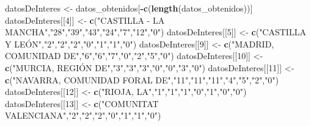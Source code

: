 \documentclass[
]{article}
\newenvironment{Shaded}{\begin{snugshade}}{\end{snugshade}}
\newcommand{\DecValTok}[1]{\textcolor[rgb]{0.00,0.00,0.81}{#1}}
\newcommand{\FunctionTok}[1]{\textcolor[rgb]{0.13,0.29,0.53}{\textbf{#1}}}
\newcommand{\NormalTok}[1]{#1}
\newcommand{\OtherTok}[1]{\textcolor[rgb]{0.56,0.35,0.01}{#1}}
\newcommand{\SpecialCharTok}[1]{\textcolor[rgb]{0.81,0.36,0.00}{\textbf{#1}}}
\newcommand{\StringTok}[1]{\textcolor[rgb]{0.31,0.60,0.02}{#1}}
\begin{document}
\begin{Shaded}
\begin{Highlighting}[]
\NormalTok{datosDeInteres }\OtherTok{\textless{}{-}}\NormalTok{ datos\_obtenidos[}\SpecialCharTok{{-}}\FunctionTok{c}\NormalTok{(}\FunctionTok{length}\NormalTok{(datos\_obtenidos))]}
\NormalTok{datosDeInteres[[}\DecValTok{4}\NormalTok{]] }\OtherTok{\textless{}{-}} \FunctionTok{c}\NormalTok{(}\StringTok{"CASTILLA {-} LA MANCHA"}\NormalTok{,}\StringTok{"28"}\NormalTok{,}\StringTok{"39"}\NormalTok{,}\StringTok{"43"}\NormalTok{,}\StringTok{"24"}\NormalTok{,}\StringTok{"7"}\NormalTok{,}\StringTok{"12"}\NormalTok{,}\StringTok{"0"}\NormalTok{)}
\NormalTok{datosDeInteres[[}\DecValTok{5}\NormalTok{]] }\OtherTok{\textless{}{-}} \FunctionTok{c}\NormalTok{(}\StringTok{"CASTILLA Y LEÓN"}\NormalTok{,}\StringTok{"2"}\NormalTok{,}\StringTok{"2"}\NormalTok{,}\StringTok{"2"}\NormalTok{,}\StringTok{"0"}\NormalTok{,}\StringTok{"1"}\NormalTok{,}\StringTok{"1"}\NormalTok{,}\StringTok{"0"}\NormalTok{)}
\NormalTok{datosDeInteres[[}\DecValTok{9}\NormalTok{]] }\OtherTok{\textless{}{-}} \FunctionTok{c}\NormalTok{(}\StringTok{"MADRID, COMUNIDAD DE"}\NormalTok{,}\StringTok{"6"}\NormalTok{,}\StringTok{"6"}\NormalTok{,}\StringTok{"7"}\NormalTok{,}\StringTok{"0"}\NormalTok{,}\StringTok{"2"}\NormalTok{,}\StringTok{"5"}\NormalTok{,}\StringTok{"0"}\NormalTok{)}
\NormalTok{datosDeInteres[[}\DecValTok{10}\NormalTok{]] }\OtherTok{\textless{}{-}} \FunctionTok{c}\NormalTok{(}\StringTok{"MURCIA, REGIÓN DE"}\NormalTok{,}\StringTok{"3"}\NormalTok{,}\StringTok{"3"}\NormalTok{,}\StringTok{"3"}\NormalTok{,}\StringTok{"0"}\NormalTok{,}\StringTok{"0"}\NormalTok{,}\StringTok{"3"}\NormalTok{,}\StringTok{"0"}\NormalTok{)}
\NormalTok{datosDeInteres[[}\DecValTok{11}\NormalTok{]] }\OtherTok{\textless{}{-}} \FunctionTok{c}\NormalTok{(}\StringTok{"NAVARRA, COMUNIDAD FORAL DE"}\NormalTok{,}\StringTok{"11"}\NormalTok{,}\StringTok{"11"}\NormalTok{,}\StringTok{"11"}\NormalTok{,}\StringTok{"4"}\NormalTok{,}\StringTok{"5"}\NormalTok{,}\StringTok{"2"}\NormalTok{,}\StringTok{"0"}\NormalTok{)}
\NormalTok{datosDeInteres[[}\DecValTok{12}\NormalTok{]] }\OtherTok{\textless{}{-}} \FunctionTok{c}\NormalTok{(}\StringTok{"RIOJA, LA"}\NormalTok{,}\StringTok{"1"}\NormalTok{,}\StringTok{"1"}\NormalTok{,}\StringTok{"1"}\NormalTok{,}\StringTok{"0"}\NormalTok{,}\StringTok{"1"}\NormalTok{,}\StringTok{"0"}\NormalTok{,}\StringTok{"0"}\NormalTok{)}
\NormalTok{datosDeInteres[[}\DecValTok{13}\NormalTok{]] }\OtherTok{\textless{}{-}} \FunctionTok{c}\NormalTok{(}\StringTok{"COMUNITAT VALENCIANA"}\NormalTok{,}\StringTok{"2"}\NormalTok{,}\StringTok{"2"}\NormalTok{,}\StringTok{"2"}\NormalTok{,}\StringTok{"0"}\NormalTok{,}\StringTok{"1"}\NormalTok{,}\StringTok{"1"}\NormalTok{,}\StringTok{"0"}\NormalTok{)}
\end{Highlighting}
\end{Shaded}
\end{document}
